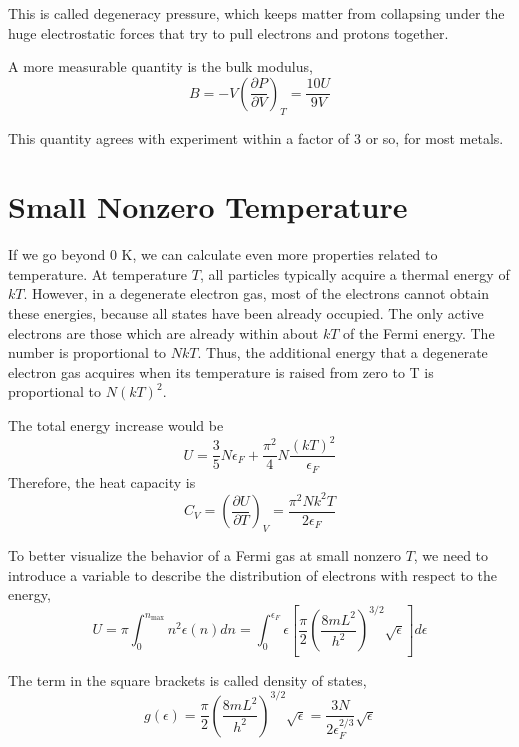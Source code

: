 This is called degeneracy pressure, which keeps matter from collapsing under the huge electrostatic forces that try to pull electrons and protons together.

A more measurable quantity is the bulk modulus,
\begin{equation}
B = -V (\frac{\partial P}{\partial V})_T = \frac{10U}{9V} 
\end{equation}

This quantity agrees with experiment within a factor of 3 or so, for most metals.

\section{Small Nonzero Temperature}
If we go beyond 0 K, we can calculate even more properties related to temperature. At temperature $T$, all particles typically acquire a thermal energy of $kT$. However, in a degenerate electron gas, most of the electrons cannot obtain these energies, because all states have been already occupied. 
The only active electrons are those which are already within about $kT$ of the Fermi energy. The number is proportional to $NkT$. Thus, the additional energy that a degenerate electron gas acquires when its temperature is raised from zero to T is proportional to $N(kT)^2$.

The total energy increase would be 
\begin{equation}
 U = \frac{3}{5} N \epsilon_{F} + \frac{\pi^2}{4} N \frac{(kT)^2}{\epsilon_{F}}
\end{equation}
Therefore, the heat capacity is
\begin{equation}
C_V = (\frac{\partial U}{\partial T})_V = \frac{\pi^2Nk^2T}{2\epsilon_F}
\end{equation}

To better visualize the behavior of a Fermi gas at small nonzero $T$, we need to introduce a variable to describe the distribution of electrons with respect to the energy,
\begin{equation}
U = \pi \int_0^{n_\textrm{max}} n^2 \epsilon(n) dn 
  = \int _0 ^{\epsilon_F} \epsilon[\frac{\pi}{2} (\frac{8mL^2}{h^2}) ^{3/2} \sqrt{\epsilon}] d\epsilon
\end{equation}

The term in the square brackets is called density of states,
\begin{equation}
g(\epsilon) = \frac{\pi}{2} (\frac{8mL^2}{h^2}) ^{3/2} \sqrt{\epsilon} = \frac{3N}{2\epsilon_F^{2/3}} \sqrt{\epsilon}
\end{equation}

